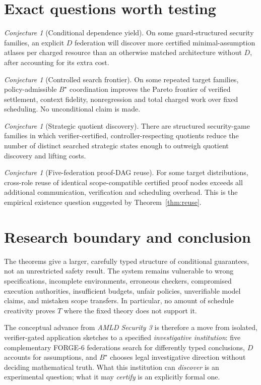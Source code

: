 \documentclass[11pt,letterpaper,oneside]{book}
\theoremstyle{definition}
\theoremstyle{remark}
\newtheorem{conjecture}[theorem]{Conjecture}
\begin{document}
\section{Exact questions worth testing}
\begin{conjecture}[Conditional dependence yield]
On some guard-structured security families, an explicit $D$
federation will discover more certified minimal-assumption atlases
per charged resource than an otherwise matched architecture without
$D$, after accounting for its extra cost.
\end{conjecture}
\begin{conjecture}[Controlled search frontier]
On some repeated target families, policy-admissible $B^\star$
coordination improves the Pareto frontier of verified settlement,
context fidelity, nonregression and total charged work over fixed
scheduling. No unconditional claim is made.
\end{conjecture}
\begin{conjecture}[Strategic quotient discovery]
There are structured security-game families in which verifier-certified,
controller-respecting quotients reduce the number of distinct
searched strategic states enough to outweigh quotient discovery and
lifting costs.
\end{conjecture}
\begin{conjecture}[Five-federation proof-DAG reuse]
For some target distributions, cross-role reuse of identical
scope-compatible certified proof nodes exceeds all additional
communication, verification and scheduling overhead. This is the
empirical existence question suggested by Theorem~\ref{thm:reuse}.
\end{conjecture}

\section{Research boundary and conclusion}
The theorems give a larger, carefully typed structure of conditional
guarantees, not an unrestricted safety result. The system remains
vulnerable to wrong specifications, incomplete environments, erroneous
checkers, compromised execution authorities, insufficient budgets,
unfair policies, unverifiable model claims, and mistaken scope
transfers. In particular, no amount of schedule creativity proves
$T$ where the fixed theory does not support it.

The conceptual advance from \emph{AMLD Security 3} is therefore a move
from isolated, verifier-gated application sketches to a specified
\emph{investigative institution}: five complementary FORGE-6
federations search for differently typed conclusions, $D$ accounts
for assumptions, and $B^\star$ chooses legal investigative direction
without deciding mathematical truth. What this institution can
\emph{discover} is an experimental question; what it may
\emph{certify} is an explicitly formal one.
\end{document}
